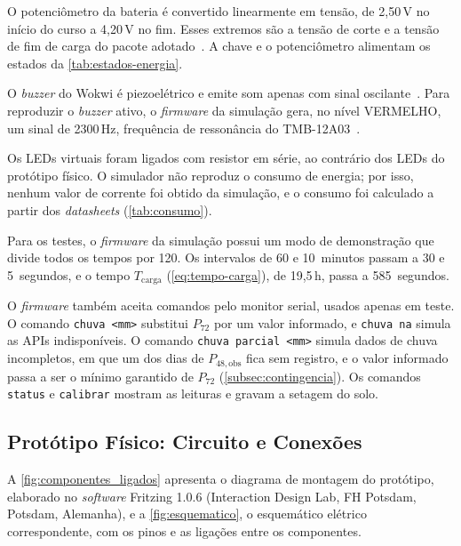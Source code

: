 O potenciômetro da bateria é convertido linearmente em tensão, de 2,50\,V
no início do curso a 4,20\,V no fim. Esses extremos são a tensão de corte
e a tensão de fim de carga do pacote adotado~\cite{adafruit_5035}. A
chave e o potenciômetro alimentam os estados da \autoref{tab:estados-energia}.

O \textit{buzzer} do Wokwi é piezoelétrico e emite som apenas com sinal
oscilante~\cite{wokwi_buzzer}. Para reproduzir o \textit{buzzer} ativo,
o \textit{firmware} da simulação gera, no nível VERMELHO, um sinal de
2300\,Hz, frequência de ressonância do TMB-12A03~\cite{quickteck_tmb12a03}.

Os LEDs virtuais foram ligados com resistor em série, ao contrário dos
LEDs do protótipo físico. O simulador não reproduz o consumo de energia;
por isso, nenhum valor de corrente foi obtido da simulação, e o consumo
foi calculado a partir dos \textit{datasheets} (\autoref{tab:consumo}).

Para os testes, o \textit{firmware} da simulação possui um modo de
demonstração que divide todos os tempos por 120. Os intervalos de 60 e
10~minutos passam a 30 e 5~segundos, e o tempo $T_{\mathrm{carga}}$
(\autoref{eq:tempo-carga}), de 19,5\,h, passa a 585~segundos.

O \textit{firmware} também aceita comandos pelo monitor serial, usados
apenas em teste. O comando \texttt{chuva <mm>} substitui $P_{72}$ por um
valor informado, e \texttt{chuva na} simula as APIs indisponíveis.
O comando \texttt{chuva parcial <mm>} simula dados de chuva incompletos, em que um dos dias de $P_{48,\mathrm{obs}}$ fica sem registro, e o valor
informado passa a ser o mínimo garantido de $P_{72}$
(\autoref{subsec:contingencia}). Os
comandos \texttt{status} e \texttt{calibrar} mostram as leituras e gravam
a setagem do solo.

\subsection{Protótipo Físico: Circuito e Conexões}
\label{subsec:circuito}

A \autoref{fig:componentes_ligados} apresenta o diagrama de montagem do
protótipo, elaborado no \textit{software} Fritzing 1.0.6
(Interaction Design Lab, FH Potsdam, Potsdam, Alemanha), e a
\autoref{fig:esquematico}, o esquemático elétrico correspondente, com os
pinos e as ligações entre os componentes.


